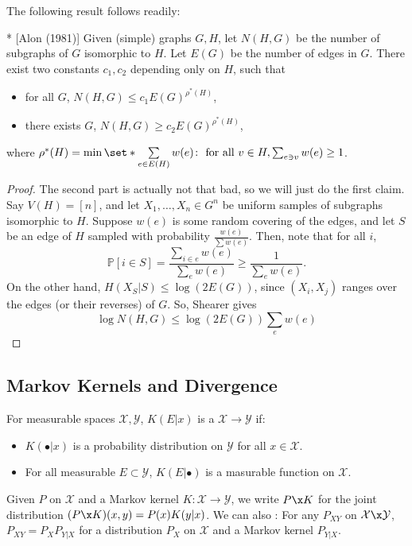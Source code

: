 The following result follows readily:

\begin{exm}*
	[Alon (1981)]
	Given (simple) graphs $G, H$, let $N(H,G)$ be the number of subgraphs of $G$ isomorphic to $H$.
	Let $E(G)$ be the number of edges in $G$. 
	There exist two constants $c_1, c_2$ depending only on $H$, such that 
	\begin{itemize}
		\item for all $G$, $N(H,G) \leq c_1 E(G)^{\rho^*(H)}$,
		\item there exists $G$, $N(H,G) \geq c_2 E(G)^{\rho^*(H)}$,
	\end{itemize}
	where $\rho^*(H) = \min\set*{\sum\limits_{e\in E(H)}  w(e) \colon \text{ for all } v\in H, \sum_{e\ni v} w(e) \geq 1}$.
\end{exm}

\begin{proof}
	The second part is actually not that bad, so we will just do the first claim.
	Say $V(H) = [n]$, and let $X_1, \ldots, X_n\in G^n$ be uniform samples of subgraphs isomorphic to $H$.
	Suppose $w(e)$ is some random covering of the edges, and let $S$ be an edge of $H$ sampled with probability $\frac{w(e)}{\sum w(e)}$.
	Then, note that for all $i$, \[
		\mathbb P[i \in S] = \frac{\sum_{i\in e} w(e)}{\sum_e w(e)} \geq \frac{1}{\sum_e w(e)}.
	\]
	On the other hand, $H(X_S|S) \leq \log (2E(G))$, since $(X_i,X_j)$ ranges over the edges (or their reverses) of $G$. So, Shearer gives \[
		\log N(H,G) \leq \log (2E(G)) \sum_e w(e)
	\]
\end{proof}

\subsection{Markov Kernels and Divergence}

\begin{defn}
	For measurable spaces $\mathcal X, \mathcal Y$, $K(E|x)$ is a  $\mathcal X\to \mathcal Y$ if:
	\begin{itemize}
		\item $K(\bullet | x)$ is a probability distribution on $\mathcal Y$ for all $x\in \mathcal X$.
		\item For all measurable $E\subset \mathcal Y$, $K(E|\bullet)$ is a masurable function on $\mathcal X$.
	\end{itemize}
	Given $P$ on $\mathcal X$ and a Markov kernel $K\colon \mathcal X\to \mathcal Y$, we write $P\x K$ for the joint distribution $(P\x K)(x,y) = P(x)K(y|x)$. 
	We can also : For any $P_{XY}$ on $\mathcal X\x \mathcal Y$, $P_{XY} = P_X P_{Y|X}$ for a distribution $P_X$ on $\mathcal X$ and a Markov kernel $P_{Y|X}$.
\end{defn}

